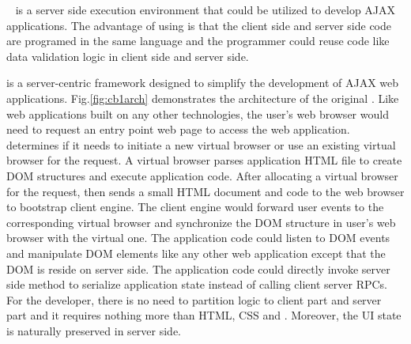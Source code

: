 \nodejs{}~\cite{tilkov2010node} is a server side \js{} execution environment 
that could be utilized to develop AJAX applications.
The advantage of using \nodejs{} is that the client side and server side code are programed in
the same language and
the programmer could reuse code like data validation logic in client side and server side.







\cb{} is a server-centric framework designed to simplify the development of AJAX web applications.
Fig.\ref{fig:cb1arch} demonstrates the architecture of the original \cb{}. 
Like web applications built on any other technologies, the user's web browser would need to request an entry
point web page to access the web application.
\cb{} determines if it needs to initiate a new virtual browser or use an existing 
virtual browser for the request.
A virtual browser parses application HTML file to create DOM structures and
execute application \js{} code.
After allocating a virtual browser for the request,
\cb{} then sends a small HTML document and \js{} code to the web browser to
bootstrap client engine.
The client engine would forward user events to the corresponding virtual browser and 
synchronize the DOM structure in user's web browser with the virtual one.
The application \js{} code could listen to DOM events and manipulate DOM elements 
like any other web application except that the DOM is reside on server side.
The application code could directly invoke server side method to serialize application
state instead of calling client server RPCs. %
For the developer, there is no need to partition logic to client part and server part
and it requires nothing more than HTML, CSS and \js{}.
Moreover, 
the UI state is naturally preserved in server side.


